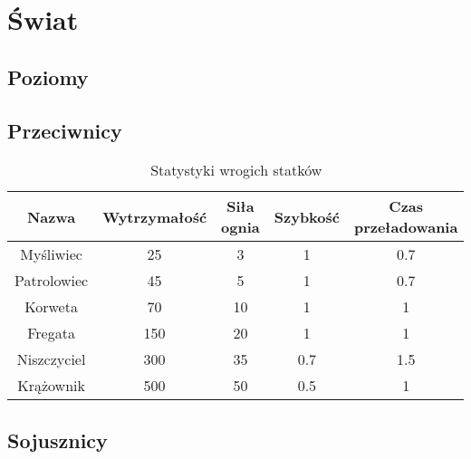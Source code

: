 \chapter{Świat}

\section{Poziomy}

\section{Przeciwnicy}
\begin{table}[h]
\centering
\begin{tabular}{ | c | c | c | c | c | }
\hline
\textbf{Nazwa} & \textbf{Wytrzymałość} & \textbf{Siła ognia} & \textbf{Szybkość} & \textbf{Czas przeładowania} \\ \hline
Myśliwiec 	& 25 	& 3 	& 1 	& 0.7	\\ \hline
Patrolowiec & 45 	& 5 	& 1 	& 0.7 	\\ \hline
Korweta 	& 70 	& 10 	& 1 	& 1 	\\ \hline
Fregata 	& 150 	& 20 	& 1 	& 1		\\ \hline
Niszczyciel & 300 	& 35 	& 0.7 	& 1.5	\\ \hline
Krążownik 	& 500 	& 50 	& 0.5 	& 1		\\ \hline
\end{tabular}
\caption{Statystyki wrogich statków}
\end{table}

\section{Sojusznicy}
